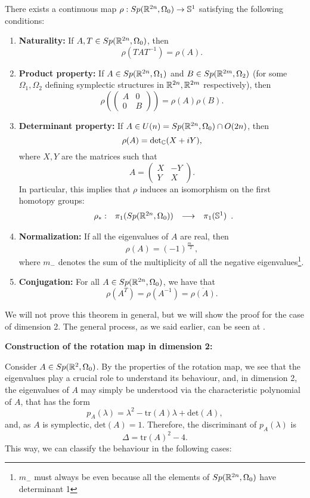 \begin{theo}
There exists a continuous map $\rho : Sp(\mathbb{R}^{2n},\Omega_0) \rightarrow \mathbb{S}^1$ satisfying the following conditions:
\begin{enumerate}
	\item {\bf Naturality:} If $A,T \in Sp(\mathbb{R}^{2n},\Omega_0)$, then
	\[\rho(TAT^{-1}) = \rho(A) .\]
	\item {\bf Product property:} If $A \in Sp(\mathbb{R}^{2n},\Omega_1)$ and $B \in Sp(\mathbb{R}^{2m},\Omega_2)$ (for some $\Omega_1, \Omega_2$ defining symplectic structures in $\mathbb{R}^{2n}, \mathbb{R}^{2m}$ respectively), then
	\[\rho\left(\begin{pmatrix}A & 0 \\ 0 & B\end{pmatrix}\right) = \rho(A) \rho(B) .\]
	\item {\bf Determinant property:} If $A \in U(n) = Sp(\mathbb{R}^ {2n},\Omega_0) \cap O(2n)$, then
	\[\rho(A) = \text{det}_{\mathbb{C}}(X+iY),\]
	where $X,Y$ are the matrices such that
	\[A = \begin{pmatrix} X & -Y \\ Y & X \end{pmatrix}.\]
	In particular, this implies that $\rho$ induces an isomorphism on the first homotopy groups:
	\[\begin{array}{rccc} \rho_{\ast} : & \pi_1(Sp(\mathbb{R}^{2n},\Omega_0)) & \longrightarrow & \pi_1(\mathbb{S}^1) \end{array} .\]
	\item {\bf Normalization:} If all the eigenvalues of $A$ are real, then
	\[\rho(A) = (-1)^{\frac{m_{-}}2},\]
	where $m_{-}$ denotes the sum of the multiplicity of all the negative eigenvalues\footnote{$m_{-}$ must always be even because all the elements of $Sp(\mathbb{R}^{2n},\Omega_0)$ have determinant 1}.
	\item {\bf Conjugation:} For all $A \in Sp(\mathbb{R}^{2n},\Omega_0)$, we have that
	\[\rho(A^T) = \rho(A^{-1}) = \overline{\rho(A)} .\]
\end{enumerate}

\end{theo}

We will not prove this theorem in general, but we will show the proof for the case of dimension 2. The general process, as we said earlier, can be seen at \cite{gutt2012conley}.

{\bf Construction of the rotation map in dimension 2:}

Consider $A \in Sp(\mathbb{R}^2,\Omega_0)$. By the properties of the rotation map, we see that the eigenvalues play a crucial role to understand its behaviour, and, in dimension 2, the eigenvalues of $A$ may simply be understood via the characteristic polynomial of $A$, that has the form
\[p_A(\lambda) = \lambda^2 - \text{tr}(A) \lambda + \text{det}(A) ,\]
and, as $A$ is symplectic, $\text{det}(A) = 1$. Therefore, the discriminant of $p_A(\lambda)$ is
\[\Delta = \text{tr}(A)^2 - 4 .\]
This way, we can classify the behaviour in the following cases:

